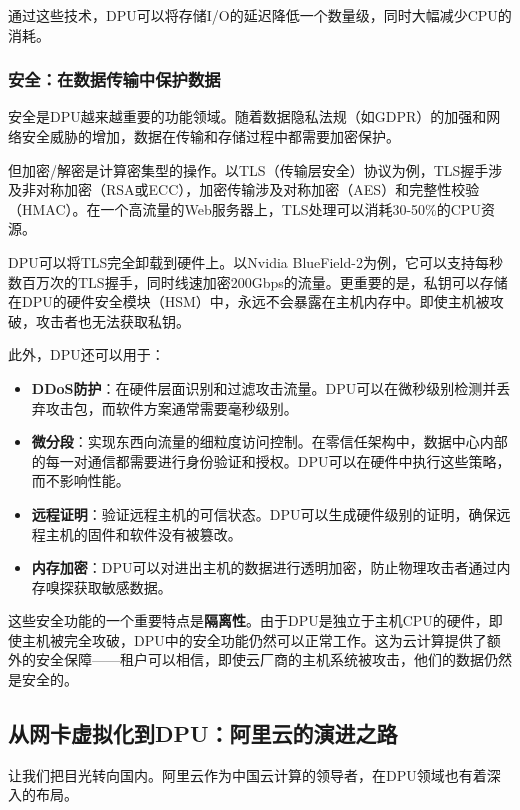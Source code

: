 通过这些技术，DPU可以将存储I/O的延迟降低一个数量级，同时大幅减少CPU的消耗。

\subsubsection{安全：在数据传输中保护数据}

安全是DPU越来越重要的功能领域。随着数据隐私法规（如GDPR）的加强和网络安全威胁的增加，数据在传输和存储过程中都需要加密保护。

但加密/解密是计算密集型的操作。以TLS（传输层安全）协议为例，TLS握手涉及非对称加密（RSA或ECC），加密传输涉及对称加密（AES）和完整性校验（HMAC）。在一个高流量的Web服务器上，TLS处理可以消耗30-50\%的CPU资源。

DPU可以将TLS完全卸载到硬件上。以Nvidia BlueField-2为例，它可以支持每秒数百万次的TLS握手，同时线速加密200Gbps的流量。更重要的是，私钥可以存储在DPU的硬件安全模块（HSM）中，永远不会暴露在主机内存中。即使主机被攻破，攻击者也无法获取私钥。

此外，DPU还可以用于：

\begin{itemize}
    \item \textbf{DDoS防护}：在硬件层面识别和过滤攻击流量。DPU可以在微秒级别检测并丢弃攻击包，而软件方案通常需要毫秒级别。
    
    \item \textbf{微分段}：实现东西向流量的细粒度访问控制。在零信任架构中，数据中心内部的每一对通信都需要进行身份验证和授权。DPU可以在硬件中执行这些策略，而不影响性能。
    
    \item \textbf{远程证明}：验证远程主机的可信状态。DPU可以生成硬件级别的证明，确保远程主机的固件和软件没有被篡改。
    
    \item \textbf{内存加密}：DPU可以对进出主机的数据进行透明加密，防止物理攻击者通过内存嗅探获取敏感数据。
\end{itemize}

这些安全功能的一个重要特点是\textbf{隔离性}。由于DPU是独立于主机CPU的硬件，即使主机被完全攻破，DPU中的安全功能仍然可以正常工作。这为云计算提供了额外的安全保障——租户可以相信，即使云厂商的主机系统被攻击，他们的数据仍然是安全的。

\subsection{从网卡虚拟化到DPU：阿里云的演进之路}

让我们把目光转向国内。阿里云作为中国云计算的领导者，在DPU领域也有着深入的布局。

